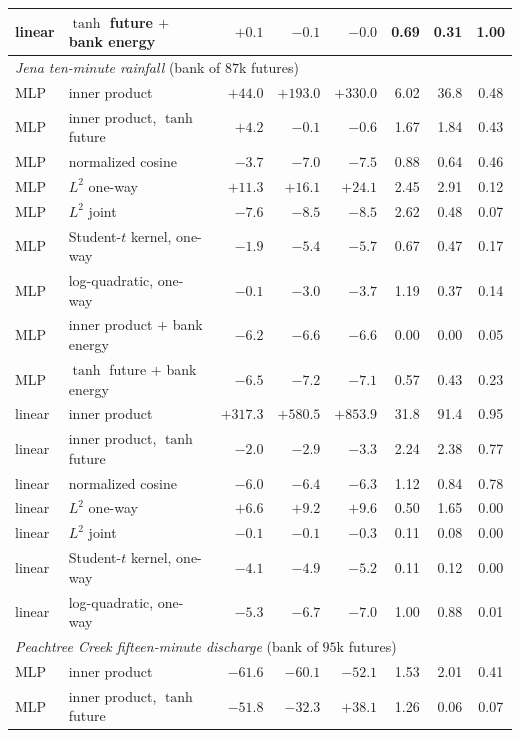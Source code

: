 \documentclass[11pt]{article}
\theoremstyle{plain}
\theoremstyle{definition}
\theoremstyle{remark}
\begin{document}
\begin{table}[ht]
\begin{tabular}{llrrr|rr|c}
  linear & $\tanh$ future $+$ bank energy & $+0.1$ & $-0.1$ & $-0.0$ & 0.69 & 0.31 & 1.00 \\
  \midrule
  \multicolumn{8}{l}{\emph{Jena ten-minute rainfall} (bank of $87$k futures)} \\
  MLP & inner product & $+44.0$ & $+193.0$ & $+330.0$ & 6.02 & 36.8 & 0.48 \\
  MLP & inner product, $\tanh$ future & $+4.2$ & $-0.1$ & $-0.6$ & 1.67 & 1.84 & 0.43 \\
  MLP & normalized cosine & $-3.7$ & $-7.0$ & $-7.5$ & 0.88 & 0.64 & 0.46 \\
  MLP & $L^2$ one-way & $+11.3$ & $+16.1$ & $+24.1$ & 2.45 & 2.91 & 0.12 \\
  MLP & $L^2$ joint & $-7.6$ & $-8.5$ & $-8.5$ & 2.62 & 0.48 & 0.07 \\
  MLP & Student-$t$ kernel, one-way & $-1.9$ & $-5.4$ & $-5.7$ & 0.67 & 0.47 & 0.17 \\
  MLP & log-quadratic, one-way & $-0.1$ & $-3.0$ & $-3.7$ & 1.19 & 0.37 & 0.14 \\
  MLP & inner product $+$ bank energy & $-6.2$ & $-6.6$ & $-6.6$ & 0.00 & 0.00 & 0.05 \\
  MLP & $\tanh$ future $+$ bank energy & $-6.5$ & $-7.2$ & $-7.1$ & 0.57 & 0.43 & 0.23 \\
  \midrule
  linear & inner product & $+317.3$ & $+580.5$ & $+853.9$ & 31.8 & 91.4 & 0.95 \\
  linear & inner product, $\tanh$ future & $-2.0$ & $-2.9$ & $-3.3$ & 2.24 & 2.38 & 0.77 \\
  linear & normalized cosine & $-6.0$ & $-6.4$ & $-6.3$ & 1.12 & 0.84 & 0.78 \\
  linear & $L^2$ one-way & $+6.6$ & $+9.2$ & $+9.6$ & 0.50 & 1.65 & 0.00 \\
  linear & $L^2$ joint & $-0.1$ & $-0.1$ & $-0.3$ & 0.11 & 0.08 & 0.00 \\
  linear & Student-$t$ kernel, one-way & $-4.1$ & $-4.9$ & $-5.2$ & 0.11 & 0.12 & 0.00 \\
  linear & log-quadratic, one-way & $-5.3$ & $-6.7$ & $-7.0$ & 1.00 & 0.88 & 0.01 \\
  \midrule
  \multicolumn{8}{l}{\emph{Peachtree Creek fifteen-minute discharge} (bank of $95$k futures)} \\
  MLP & inner product & $-61.6$ & $-60.1$ & $-52.1$ & 1.53 & 2.01 & 0.41 \\
  MLP & inner product, $\tanh$ future & $-51.8$ & $-32.3$ & $+38.1$ & 1.26 & 0.06 & 0.07 \\

\end{tabular}
\end{table}
\end{document}
